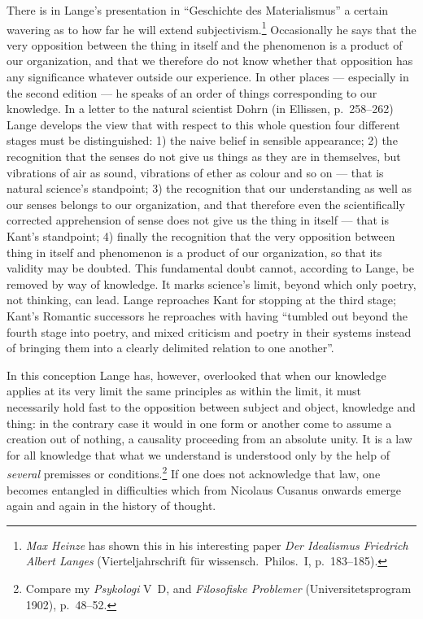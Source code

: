 \documentclass[12pt,a4paper]{book}
\newcommand{\opage}[1]{\marginnote{\footnotesize\textit{[#1]}}}
\begin{document}
There is in Lange's presentation in ``Geschichte des \opage{549}Materialismus'' a certain
wavering as to how far he will extend subjectivism.\footnote{\emph{Max Heinze} has shown
this in his interesting paper \textit{Der Idealismus Friedrich Albert Langes}
(Vierteljahrschrift für wissensch.\ Philos.\ I, p.~183--185).} Occasionally he
says that the very opposition between the thing in itself and the phenomenon is a
product of our organization, and that we therefore do not know whether that
opposition has any significance whatever outside our experience. In other places
--- especially in the second edition --- he speaks of an order of things
corresponding to our knowledge. In a letter to the natural scientist Dohrn (in
Ellissen, p.~258--262) Lange develops the view that with respect to this whole
question four different stages must be distinguished: 1) the naive belief in
sensible appearance; 2) the recognition that the senses do not give us things as
they are in themselves, but vibrations of air as sound, vibrations of ether as
colour and so on --- that is natural science's standpoint; 3) the recognition
that our understanding as well as our senses belongs to our organization, and
that therefore even the scientifically corrected apprehension of sense does not
give us the thing in itself --- that is Kant's standpoint; 4) finally the
recognition that the very opposition between thing in itself and phenomenon is a
product of our organization, so that its validity may be doubted. This
fundamental doubt cannot, according to Lange, be removed by way of knowledge. It
marks science's limit, beyond which only poetry, not thinking, can lead. Lange
reproaches Kant for stopping at the third stage; Kant's Romantic successors he
reproaches with having ``tumbled out beyond the fourth stage into poetry, and
mixed criticism and poetry in their systems instead of bringing them into a
clearly delimited relation to one another''.

In this conception Lange has, however, overlooked that when our knowledge applies
at its very limit the same principles as within the limit, it must necessarily
hold fast to the opposition between subject and object, knowledge and thing: in
the contrary case it would in one form or another come to assume a creation out
of nothing, a causality proceeding from an absolute unity. It is a law for all
knowledge that what we understand is understood only by the help of \emph{several}
premisses or conditions.\footnote{Compare my \textit{Psykologi} V~D, and
\textit{Filosofiske Problemer} (Universitetsprogram 1902), p.~48--52.} If one
does not acknowledge that law, one becomes entangled in difficulties \opage{550}which from
Nicolaus Cusanus onwards emerge again and again in the history of thought.
\end{document}
